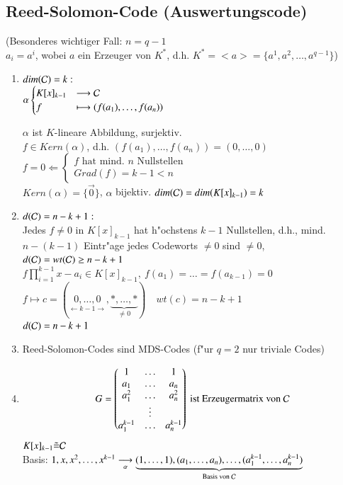 \subsection{Reed-Solomon-Code (Auswertungscode)}
(Besonderes wichtiger Fall: $n=q-1$ \\
$a_i=a^i$, wobei $a$ ein Erzeuger von $K^{*}$, d.h. $K^*=<a>=\lbrace a^1,a^2,\ldots,a^{q-1} \rbrace$) %
\begin{enumerate}[(1)]
	\item
	$dim (\mathcal{C}) = k:$ \\
	$\alpha \begin{cases} K[x]_{k-1} &\longrightarrow \mathcal{C} \\ f &\longmapsto (f(a_1),\ldots,f(a_n)) \end{cases}$

$\alpha$ ist $K$-lineare Abbildung, surjektiv.\\
$f \in Kern(\alpha)$, d.h. $(f(a_1),\ldots,f(a_n))=(0,\ldots,0)$\\
$f=0 \Leftarrow \begin{cases}
f \text{ hat mind. $n$ Nullstellen} \\
Grad(f)=k-1 < n
\end{cases}$ \\
$Kern(\alpha)=\lbrace \vec{0} \rbrace$, $\alpha$ bijektiv. $dim (\mathcal{C}) = dim (K[x]_{k-1})=k$
\item
	$d(\mathcal{C})=n-k+1:$\\
	Jedes $f\neq 0$ in $K[x]_{k-1}$ hat h"ochstens $k-1$ Nullstellen, d.h., mind. $n-(k-1)$ Eintr"age jedes Codeworts $\neq 0$ sind $\neq 0$, $d(\mathcal{C}) = wt(\mathcal{C}) \geq n-k+1$\\
	$f \prod_{i=1}^{k-1}{x-a_i}	\in K[x]_{k-1},\ f(a_1)=\ldots=f(a_{k-1})=0$\\
	$f \longmapsto c=(\underset{\leftarrow k-1 \rightarrow}{0,\ldots,0},\underset{\neq 0}{\underbrace{*,\ldots,*}})\quad wt(c) = n-k+1$\\
	$d (\mathcal{C}) = n-k+1$
	\item
	Reed-Solomon-Codes sind MDS-Codes (f"ur $q=2$ nur triviale Codes)
	\item
	\[
	G=
	\begin{pmatrix}
		1 & \ldots & 1 \\ 
		a_1 & \ldots & a_n \\ 
		a_1^2 & \ldots & a_n^2 \\ 
		 & \vdots &  \\ 
		a_1^{k-1} & \ldots & a_n^{k-1}
	\end{pmatrix} \text{ ist Erzeugermatrix von } \mathcal{C} 
	\]
	$K[x]_{k-1} \tilde{=}\mathcal{C}$\\
	Basis: $1,x,x^2,\ldots,x^{k-1} \underset{\alpha}{\longrightarrow} \underset{\text{Basis von } \mathcal{C}}{\underbrace{(1,\ldots,1),(a_1,\ldots,a_n),\ldots,(a_1^{k-1},\ldots,a_n^{k-1})}}$
\end{enumerate}

